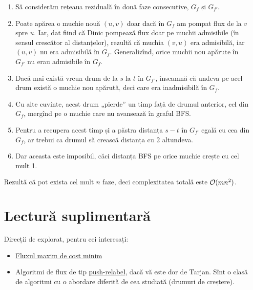 \documentclass[../main.tex]{subfiles}
\begin{document}
\begin{enumerate}
  \item Să considerăm rețeaua reziduală în două faze consecutive, $G_f$ și $G_{f'}$.

  \item Poate apărea o muchie nouă $(u,v)$ doar dacă în $G_f$ am pompat flux de la $v$ spre $u$. Iar, dat fiind că Dinic pompează flux doar pe muchii admisibile (în sensul crescător al distanțelor), rezultă că muchia $(v, u)$ era admisibilă, iar $(u, v)$ nu era admisibilă în $G_f$. Generalizînd, orice muchii nou apărute în $G_{f'}$ nu erau admisibile în $G_f$.

  \item Dacă mai există vreun drum de la $s$ la $t$ în $G_{f'}$, înseamnă că undeva pe acel drum există o muchie nou apărută, deci care era inadmisibilă în $G_f$.

  \item Cu alte cuvinte, acest drum „pierde” un timp față de drumul anterior, cel din $G_f$, mergînd pe o muchie care nu avansează în graful BFS.

  \item Pentru a recupera acest timp și a păstra distanța $s-t$ în $G_{f'}$ egală cu cea din $G_f$, ar trebui ca drumul să crească distanța cu 2 altundeva.

  \item Dar aceasta este imposibil, căci distanța BFS pe orice muchie crește cu cel mult 1.
\end{enumerate}

Rezultă că pot exista cel mult $n$ faze, deci complexitatea totală este $\mathcal{O}(mn^2)$.

\section{Lectură suplimentară}

Direcții de explorat, pentru cei interesați:

\begin{itemize}
  \item \href{https://cp-algorithms.com/graph/min_cost_flow.html}{Fluxul maxim de cost minim}

  \item Algoritmi de flux de tip \href{https://cp-algorithms.com/graph/push-relabel.html}{push-relabel}, dacă vă este dor de Tarjan. Sînt o clasă de algoritmi cu o abordare diferită de cea studiată (drumuri de creștere).
\end{itemize}
\end{document}
